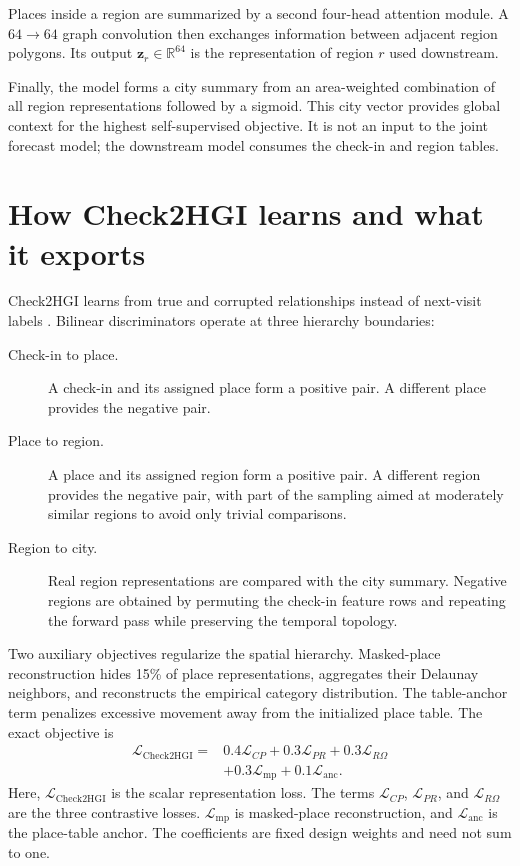 Places inside a region are summarized by a second four-head attention module. A
$64\rightarrow64$ graph convolution then exchanges information between adjacent
region polygons. Its output $\mathbf{z}_r\in\mathbb{R}^{64}$ is the representation
of region $r$ used downstream.

Finally, the model forms a city summary from an area-weighted combination of all
region representations followed by a sigmoid. This city vector provides global
context for the highest self-supervised objective. It is not an input to the joint
forecast model; the downstream model consumes the check-in and region tables.

\section{How Check2HGI learns and what it exports}
\label{sec:apx-check2hgi-learning}

Check2HGI learns from true and corrupted relationships instead of next-visit labels
\cite{velickovic2019deep,huang2023hgi}. Bilinear discriminators operate at three
hierarchy boundaries:

\begin{description}
    \item[Check-in to place.] A check-in and its assigned place form a positive
    pair. A different place provides the negative pair.

    \item[Place to region.] A place and its assigned region form a positive pair.
    A different region provides the negative pair, with part of the sampling aimed
    at moderately similar regions to avoid only trivial comparisons.

    \item[Region to city.] Real region representations are compared with the city
    summary. Negative regions are obtained by permuting the check-in feature rows
    and repeating the forward pass while preserving the temporal topology.
\end{description}

Two auxiliary objectives regularize the spatial hierarchy. Masked-place
reconstruction hides 15\% of place representations, aggregates their Delaunay
neighbors, and reconstructs the empirical category distribution. The table-anchor
term penalizes excessive movement away from the initialized place table. The exact
objective is
\begin{equation}
\begin{split}
    \mathcal{L}_{\mathrm{Check2HGI}}={}&
    0.4\mathcal{L}_{C\!P}+0.3\mathcal{L}_{P\!R}
    +0.3\mathcal{L}_{R\!\Omega}\\
    &+0.3\mathcal{L}_{\mathrm{mp}}+0.1\mathcal{L}_{\mathrm{anc}}.
\end{split}
\label{eq:apx-check2hgi-loss}
\end{equation}
Here, $\mathcal{L}_{\mathrm{Check2HGI}}$ is the scalar representation loss.
The terms $\mathcal{L}_{C\!P}$, $\mathcal{L}_{P\!R}$, and
$\mathcal{L}_{R\!\Omega}$ are the three contrastive losses.
$\mathcal{L}_{\mathrm{mp}}$ is masked-place reconstruction, and
$\mathcal{L}_{\mathrm{anc}}$ is the place-table anchor. The coefficients are fixed
design weights and need not sum to one.


